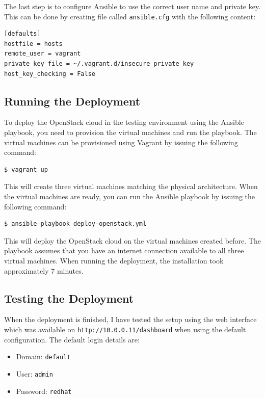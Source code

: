 The last step is to configure Ansible to use the correct user name and private key. This can be done by creating file called \texttt{ansible.cfg} with the following content:

\begin{lstlisting}
[defaults]
hostfile = hosts
remote_user = vagrant
private_key_file = ~/.vagrant.d/insecure_private_key
host_key_checking = False
\end{lstlisting}

\subsection{Running the Deployment}

To deploy the OpenStack cloud in the testing environment using the Ansible playbook, you need to provision the virtual machines and run the playbook. The virtual machines can be provisioned using Vagrant by issuing the following command:

\begin{lstlisting}
$ vagrant up
\end{lstlisting}

This will create three virtual machines matching the physical architecture. When the virtual machines are ready, you can run the Ansible playbook by issuing the following command:

\begin{lstlisting}
$ ansible-playbook deploy-openstack.yml
\end{lstlisting}

This will deploy the OpenStack cloud on the virtual machines created before. The playbook assumes that you have an internet connection available to all three virtual machines. When running the deployment, the installation took approximately 7 minutes.

\subsection{Testing the Deployment}

When the deployment is finished, I have tested the setup using the web interface which was available on \texttt{http://10.0.0.11/dashboard} when using the default configuration. The default login details are:

\begin{itemize}
  \item{Domain: \texttt{default}}
  \item{User: \texttt{admin}}
  \item{Password: \texttt{redhat}}
\end{itemize}

